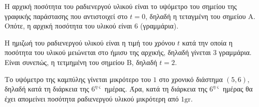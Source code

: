 \begin{alist}
\item Η αρχική ποσότητα του ραδιενεργού υλικού είναι το υψόμετρο του σημείου της γραφικής παράστασης που αντιστοιχεί στο $t=0$, δηλαδή η τεταγμένη του σημείου $\text{A}$. Οπότε, η αρχική ποσότητα του υλικού είναι $6$ (γραμμάρια).
\begin{center}
\end{center}
\item Η ημιζωή του ραδιενεργού υλικού είναι η τιμή του χρόνου $t$ κατά την οποία η ποσότητα του υλικού μειώνεται στο ήμισυ της αρχικής, δηλαδή γίνεται $3$ γραμμάρια. Είναι συνεπώς, η τετμημένη του σημείου $\text{B}$, δηλαδή $t=2$.
\item Το υψόμετρο της καμπύλης γίνεται μικρότερο του $1$ στο χρονικό διάστημα $(5,6)$, δηλαδή κατά τη διάρκεια της $6^{\eta\varsigma}$ ημέρας. Άρα, κατά τη διάρκεια της $6^{\eta\varsigma}$ ημέρας θα έχει απομείνει ποσότητα ραδιενεργού υλικού μικρότερη από $1\text{gr}$.
\end{alist}

